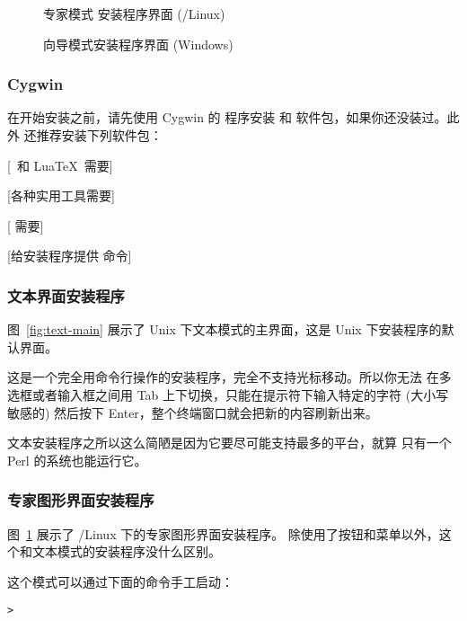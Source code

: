\documentclass{article}
\begin{document}
\begin{figure}[tb]
\caption{专家模式 \GUI{} 安装程序界面 (\GNU/Linux)}\label{fig:gui-main}
\end{figure}

\begin{figure}[tb]
\caption{向导模式安装程序界面 (Windows)}\label{fig:wizard-w32}
\end{figure}


\subsubsection{Cygwin}
\label{sec:cygwin}

在开始安装之前，请先使用 Cygwin 的  程序安装
 和  软件包，如果你还没装过。此外
还推荐安装下列软件包：
\begin{itemize*}
\item {} [\XeTeX\ 和 Lua\TeX\ 需要]
\item {} [各种实用工具需要]
\item {} [ 需要]
\item {} [给安装程序提供  命令]
\end{itemize*}

\subsubsection{文本界面安装程序}

图~\ref{fig:text-main} 展示了 Unix 下文本模式的主界面，这是 Unix
下安装程序的默认界面。

这是一个完全用命令行操作的安装程序，完全不支持光标移动。所以你无法
在多选框或者输入框之间用 Tab 上下切换，只能在提示符下输入特定的字符
(大小写敏感的) 然后按下 Enter，整个终端窗口就会把新的内容刷新出来。

文本安装程序之所以这么简陋是因为它要尽可能支持最多的平台，就算
只有一个 Perl 的系统也能运行它。

\subsubsection{专家图形界面安装程序}

图~\ref{fig:gui-main} 展示了 \GNU/Linux 下的专家图形界面安装程序。
除使用了按钮和菜单以外，这个和文本模式的安装程序没什么区别。

这个模式可以通过下面的命令手工启动：
\begin{alltt}
> 
\end{alltt}
\end{document}
